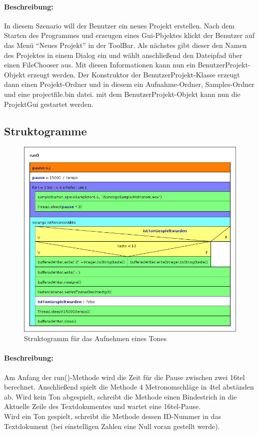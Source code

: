 \paragraph{Beschreibung:} In diesem Szenario will der Benutzer ein neues Projekt erstellen. Nach 
dem Starten des Programmes und erzeugen eines Gui-Pbjektes klickt der Benutzer auf das Menü ``Neues 
Projekt'' in der ToolBar. Als nächstes gibt dieser den Namen des Projektes in einem Dialog ein und 
wählt anschließend den Dateipfad über einen FileChooser aus. Mit diesen Informationen kann nun ein 
BenutzerProjekt-Objekt erzeugt werden. Der Konstruktor der BenutzerProjekt-Klasse erzeugt dann 
einen Projekt-Ordner und in diesem ein Aufnahme-Ordner, Samples-Ordner und eine projectfile.bin 
datei. mit dem BenutzerProjekt-Objekt kann nun die ProjektGui gestartet werden.\\



\newpage

\subsection{Struktogramme}


\begin{figure}[h]
 \centering
 \includegraphics[width=1\textwidth]{./Bilder/Ton_Aufnehmen.png}
 \caption{Struktogramm für das Aufnehmen eines Tones}
\end{figure}

\paragraph{Beschreibung:} Am Anfang der run()-Methode wird die Zeit für die Pause zwischen zwei 
16tel berechnet. Anschließend spielt die Methode 4 Metronomschläge in 4tel abständen ab. Wird kein 
Ton abgespielt, schreibt die Methode einen Bindestrich in die Aktuelle Zeile des Textdokumentes und 
wartet eine 16tel-Pause.\\
Wird ein Ton gespielt, schreibt die Methode dessen ID-Nummer in das Textdokument (bei einstelligen 
Zahlen eine Null voran gestellt werde).\\



